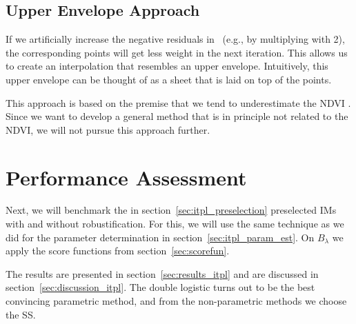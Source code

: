 {	\subsection{Upper Envelope Approach}
		If we artificially increase the negative residuals in~ (e.g.,  by multiplying with 2), the corresponding points will get less weight in the next iteration. This allows us to create an interpolation that resembles an upper envelope. Intuitively, this upper envelope can be thought of as a sheet that is laid on top of the points.
			
		This approach is based on the premise that we tend to underestimate the NDVI \citep{caoSimpleMethodImprove2018b}. Since we want to develop a general method that is in principle not related to the NDVI, we will not pursue this approach further.	
}
\section{Performance Assessment}{\label{sec:itpl_perfomance_assessment}
	Next, we will benchmark the in section~\ref{sec:itpl_preselection} preselected {{IM}}s with and without robustification. For this, we will use the same technique as we did for the parameter determination in section~\ref{sec:itpl_param_est}. On $B_\lambda$ we apply the score functions from section~\ref{sec:scorefun}.  

	The results are presented in section~\ref{sec:results_itpl} and are discussed in section~\ref{sec:discussion_itpl}. The double logistic turns out to be the best convincing parametric method, and from the non-parametric methods we choose the SS.
}


